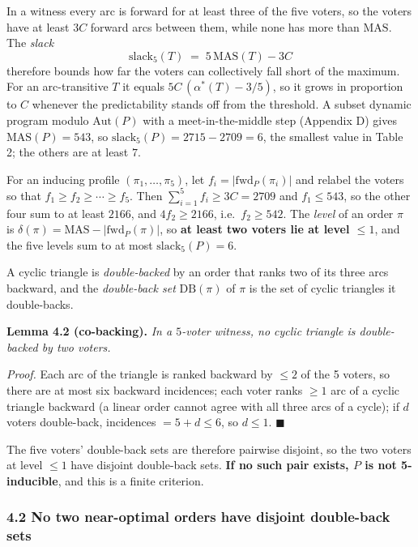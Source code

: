 \documentclass[
]{article}
\newcounter{none} %
\begin{document}
In a witness every arc is forward for at least three of the five voters,
so the voters have at least \(3C\) forward arcs between them, while none
has more than \(\mathrm{MAS}\). The \emph{slack}
\[\mathrm{slack}_5(T) \;=\; 5\,\mathrm{MAS}(T) - 3C\] therefore bounds
how far the voters can collectively fall short of the maximum. For an
arc-transitive \(T\) it equals \(5C\,(\alpha^{*}(T) - 3/5)\), so it
grows in proportion to \(C\) whenever the predictability stands off from
the threshold. A subset dynamic program modulo \(\mathrm{Aut}(P)\) with
a meet-in-the-middle step (Appendix D) gives \(\mathrm{MAS}(P) = 543\),
so \(\mathrm{slack}_5(P) = 2715 - 2709 = 6\), the smallest value in
Table 2; the others are at least \(7\).

For an inducing profile \((\pi_1, \dots, \pi_5)\), let
\(f_i = |\mathrm{fwd}_P(\pi_i)|\) and relabel the voters so that
\(f_1 \ge f_2 \ge \cdots \ge f_5\). Then
\(\sum_{i=1}^{5} f_i \ge 3C = 2709\) and \(f_1 \le 543\), so the other
four sum to at least \(2166\), and \(4 f_2 \ge 2166\),
i.e.~\(f_2 \ge 542\). The \emph{level} of an order \(\pi\) is
\(\delta(\pi) = \mathrm{MAS} - |\mathrm{fwd}_P(\pi)|\), so \textbf{at
least two voters lie at level \(\le 1\)}, and the five levels sum to at
most \(\mathrm{slack}_5(P) = 6\).

A cyclic triangle is \emph{double-backed} by an order that ranks two of
its three arcs backward, and the \emph{double-back set}
\(\mathrm{DB}(\pi)\) of \(\pi\) is the set of cyclic triangles it
double-backs.

\textbf{Lemma 4.2 (co-backing).} \emph{In a \(5\)-voter witness, no
cyclic triangle is double-backed by two voters.}

\emph{Proof.} Each arc of the triangle is ranked backward by \(\le 2\)
of the 5 voters, so there are at most six backward incidences; each
voter ranks \(\ge 1\) arc of a cyclic triangle backward (a linear order
cannot agree with all three arcs of a cycle); if \(d\) voters
double-back, incidences \(= 5 + d \le 6\), so \(d \le 1\).
\(\blacksquare\)

The five voters' double-back sets are therefore pairwise disjoint, so
the two voters at level \(\le 1\) have disjoint double-back sets.
\textbf{If no such pair exists, \(P\) is not 5-inducible}, and this is a
finite criterion.

\subsubsection{4.2 No two near-optimal orders have disjoint double-back
sets}\label{no-two-near-optimal-orders-have-disjoint-double-back-sets}
\end{document}

